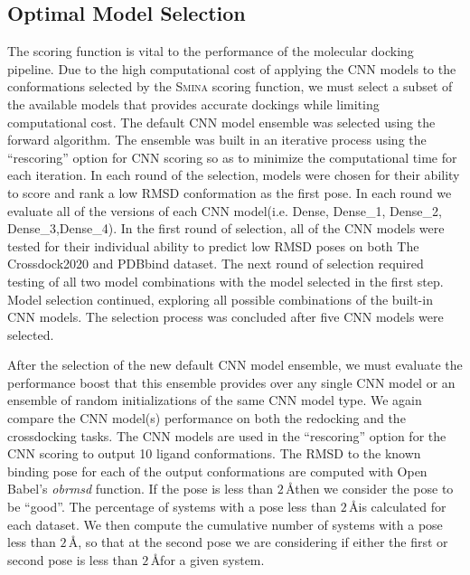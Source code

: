 \documentclass[journal=jcisd8,manuscript=article]{achemso}
\begin{document}
\subsection{Optimal Model Selection}
The scoring function is vital to the performance of the molecular docking pipeline. Due to the high computational cost of applying the CNN models to the conformations selected by the \textsc{Smina} scoring function, we must select a subset of the available models that provides accurate dockings while limiting computational cost. The default CNN model ensemble was selected using the forward algorithm. The ensemble was built in an iterative process using the ``rescoring'' option for CNN scoring so as to minimize the computational time for each iteration. In each round of the selection, models were chosen for their ability to score and rank a low RMSD conformation as the first pose. In each round we evaluate all of the versions of each CNN model(i.e. Dense, Dense\_1, Dense\_2, Dense\_3,Dense\_4). In the first round of selection, all of the CNN models were tested for their individual ability to predict low RMSD poses on both The Crossdock2020 and PDBbind dataset. The next round of selection required testing of all two model combinations with the model selected in the first step. Model selection continued, exploring all possible combinations of the built-in CNN models. The selection process was concluded after five CNN models were selected.

After the selection of the new default CNN model ensemble, we must evaluate the performance boost that this ensemble provides over any single CNN model or an ensemble of random initializations of the same CNN model type. We again compare the CNN model(s) performance on both the redocking and the crossdocking tasks. The CNN models are used in the ``rescoring'' option for the CNN scoring to output 10 ligand conformations. The RMSD to the known binding pose for each of the output conformations are computed with Open Babel's \textit{obrmsd} function. If the pose is less than $2\,$\AA then we consider the pose to be ``good''. The percentage of systems with a pose less than $2\,$\AA is calculated for each dataset. We then compute the cumulative number of systems with a pose less than $2\,$\AA, so that at the second pose we are considering if either the first or second pose is less than $2\,$\AA for a given system.
\end{document}
